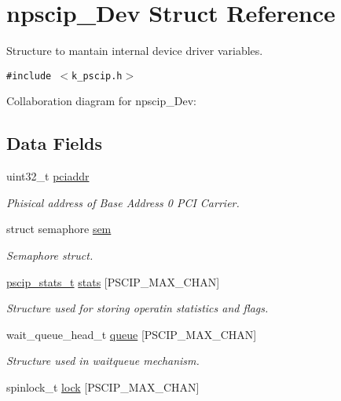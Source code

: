 \hypertarget{structnpscip___dev}{
\section{npscip\_\-Dev Struct Reference}
\label{structnpscip___dev}
}
Structure to mantain internal device driver variables.  


{\tt \#include $<$k\_\-pscip.h$>$}

Collaboration diagram for npscip\_\-Dev:\subsection*{Data Fields}
\begin{CompactItemize}
\item 
uint32\_\-t \hyperlink{structnpscip___dev_3cfba26d2b0e3fa6a0544e3d262065d2}{pciaddr}
\begin{CompactList}\small\item\em Phisical address of Base Address 0 PCI Carrier. \item\end{CompactList}\item 
struct semaphore \hyperlink{structnpscip___dev_b25b0d08851ec85f28cdd6938072e903}{sem}
\begin{CompactList}\small\item\em Semaphore struct. \item\end{CompactList}\item 
\hyperlink{structpscip__stats__t}{pscip\_\-stats\_\-t} \hyperlink{structnpscip___dev_ac9020cb6a85822da71cb6a10c06d36f}{stats} \mbox{[}PSCIP\_\-MAX\_\-CHAN\mbox{]}
\begin{CompactList}\small\item\em Structure used for storing operatin statistics and flags. \item\end{CompactList}\item 
wait\_\-queue\_\-head\_\-t \hyperlink{structnpscip___dev_88140323c9d4ac1e49fe6a36fbed02aa}{queue} \mbox{[}PSCIP\_\-MAX\_\-CHAN\mbox{]}
\begin{CompactList}\small\item\em Structure used in waitqueue mechanism. \item\end{CompactList}\item 
spinlock\_\-t \hyperlink{structnpscip___dev_fd76f4660b40aff8b4ff34ab3c254d35}{lock} \mbox{[}PSCIP\_\-MAX\_\-CHAN\mbox{]}

\end{CompactItemize}
